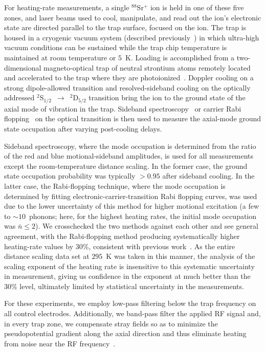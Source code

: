 \documentclass[reprint,twocolumn,prl,amsmath,amssymb,longbibliography,aps,superscriptaddress]{revtex4-1}
\begin{document}
For heating-rate measurements, a single $^{88}$Sr$^{+}$ ion is held in one of these five zones, and laser beams used to cool, manipulate, and read out the ion's electronic state are directed parallel to the trap surface, focused on the ion.  The trap is housed in a cryogenic vacuum system (described previously~\cite{Chiaverini2014}) in which ultra-high vacuum conditions can be sustained while the trap chip temperature is maintained at room temperature or $5$~K.  Loading is accomplished from a two-dimensional magneto-optical trap of neutral strontium atoms remotely located and accelerated to the trap where they are photoionized~\cite{bruzewicz2016scalable}.  Doppler cooling on a strong dipole-allowed transition and resolved-sideband cooling on the optically addressed $^{2}$S$_{1/2}$~$\rightarrow$~$^{2}$D$_{5/2}$ transition bring the ion to the ground state of the axial mode of vibration in the trap.  Sideband spectroscopy~\cite{PhysRevLett.75.4011} or carrier Rabi flopping~\cite{RoweQIC2002} on the optical transition is then used to measure the axial-mode ground state occupation after varying post-cooling delays.

Sideband spectroscopy, where the mode occupation is determined from the ratio of the red and blue motional-sideband amplitudes, is used for all measurements except the room-temperature distance scaling.  In the former case, the ground state occupation probability was typically $>0.95$ after sideband cooling.  In the latter case, the Rabi-flopping technique, where the mode occupation is determined by fitting electronic-carrier-transition Rabi flopping curves, was used due to the lower uncertainty of this method for higher motional excitation (a few to $\sim10$~phonons; here, for the highest heating rates, the initial mode occupation was $\bar{n}\leq 2$).  We crosschecked the two methods against each other and see general agreement, with the Rabi-flopping method producing systematically higher heating-rate values by 30\%, consistent with previous work~\cite{PhysRevA.89.062308}.  As the entire distance scaling data set at $295$~K was taken in this manner, the analysis of the scaling exponent of the heating rate is insensitive to this systematic uncertainty in measurement, giving us confidence in the exponent at much better than the 30\% level, ultimately limited by statistical uncertainty in the measurements.

For these experiments, we employ low-pass filtering below the trap frequency on all control electrodes.  Additionally, we band-pass filter the applied RF signal and, in every trap zone, we compensate stray fields so as to minimize the pseudopotential gradient along the axial direction and thus eliminate heating from noise near the RF frequency~\cite{arxiv_noise_paper,Blakestad2009}.
\end{document}
